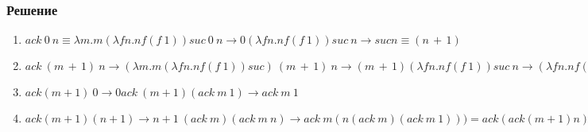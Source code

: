 \documentclass[10pt,a4paper]{article}
\begin{document}
\subsubsection*{Решение}
\begin{enumerate}
\item
$ack\ 0\ n \equiv \lambda m.m(\lambda fn.nf(f\ 1))suc\ 0\ n \rightarrow
0(\lambda fn.nf(f\ 1))suc\ n \rightarrow suc n \equiv (n\,+\,1)$
\item
$ack\ (m\,+\,1)\ n \rightarrow (\lambda m.m(\lambda fn.nf(f\ 1))suc)\
(m\,+\,1)\ n \rightarrow (m\,+\,1)(\lambda fn.nf(f\ 1))suc\ n
\rightarrow (\lambda fn.nf(f\ 1))(m\ \lambda fn.nf(f\ 1) suc) n = (\lambda
fn.nf(f\ 1))(ack\ m) n \rightarrow n(ack\ m)(ack\ m\ 1) $ \item
$ ack (m+1)\ 0 \rightarrow 0 ack\ (m+1) (ack\ m\ 1) \rightarrow ack\
m\ 1  $
\item
$ack(m+1)(n+1) \rightarrow n+1\ (ack\ m)(ack\ m\ n) \rightarrow ack\
m(n(ack\ m)(ack\ m\ 1))) = ack (ack(m+1)n)$
\end{enumerate}
\end{document}
